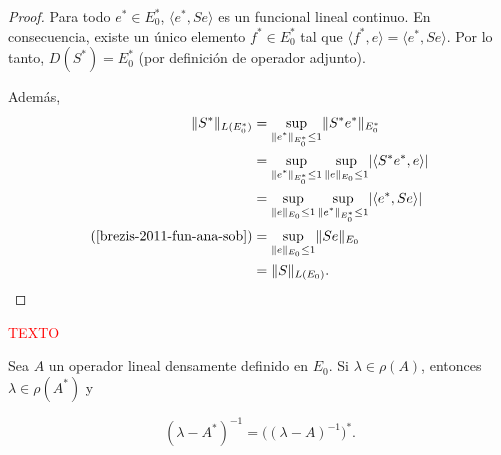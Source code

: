 \begin{proof}
    Para todo $e^* \in E_0^*$, $\langle e^*, Se \rangle$ es un funcional lineal continuo. En consecuencia, existe un único elemento $f^* \in E_0^*$ tal que $\langle f^*, e \rangle = \langle e^*, Se \rangle$. Por lo tanto, $D(S^*) = E_0^*$ (por definición de operador adjunto).

    Además,
    \begin{align*}
        \lVert S^* \rVert_{L(E^*_0)} &= \sup_{\substack{\lVert e^* \rVert_{E_0^*} \leq 1}} \lVert S^* e^* \rVert_{E_0^*}\\
        &= \sup_{\substack{\lVert e^* \rVert_{E_0^*} \leq 1}} \sup_{\substack{\lVert e \rVert_{E_0} \leq 1}} \lvert \langle S^* e^*, e \rangle \rvert\\
        &= \sup_{\substack{\lVert e \rVert_{E_0} \leq 1}} \sup_{\substack{\lVert e^* \rVert_{E_0^*} \leq 1}} \lvert \langle e^*, Se \rangle \rvert\\
        \text{(\cite[Corolario~1.4]{brezis-2011-fun-ana-sob})} &= \sup_{\substack{\lVert e \rVert_{E_0} \leq 1}} \lVert Se \rVert_{E_0}\\
        &= \lVert S \rVert_{L(E_0)}.
    \end{align*}
\end{proof}

\textcolor{red}{TEXTO}\\

\begin{Lema}
    \label{ch:semigrupos:section:dual:lema:espectroOperadorAdjunto}

    Sea $A$ un operador lineal densamente definido en $E_0$. Si $\lambda \in \rho(A)$, entonces $\lambda \in \rho(A^*)$ y

    \[(\lambda - A^*)^{-1} = \big((\lambda - A)^{-1} \big)^*.\]
\end{Lema}

